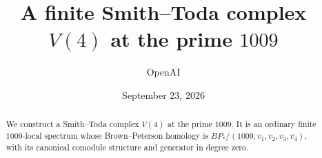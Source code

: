 \documentclass[11pt]{article}
\title{A finite Smith--Toda complex $V(4)$ at the prime $1009$}
\author{OpenAI}
\date{September 23, 2026}
\begin{document}
\maketitle
\begin{abstract}
We construct a Smith--Toda complex $V(4)$ at the prime $1009$. It is an
ordinary finite $1009$-local spectrum whose Brown--Peterson homology is
$BP_*/(1009,v_1,v_2,v_3,v_4)$, with its canonical comodule structure and
generator in degree zero.
\end{abstract}
\tableofcontents
\clearpage







\appendix



\end{document}
